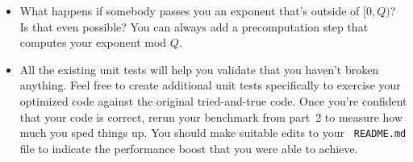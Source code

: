 \begin{itemize}
\item What happens if somebody passes you an exponent that's outside
  of $[0, Q)$? Is that even possible? You can always add a
  precomputation step that computes your exponent mod $Q$.

\item All the existing unit tests will help you validate that you
  haven't broken anything. Feel free to create additional unit tests
  specifically to exercise your optimized code against the original
  tried-and-true code. Once you're confident that your code is
  correct, rerun your benchmark from part~2 to measure how much you
  sped things up. You should make suitable edits to your {\tt
    README.md} file to indicate the performance boost that you were
  able to achieve.
\end{itemize}

\noindent




